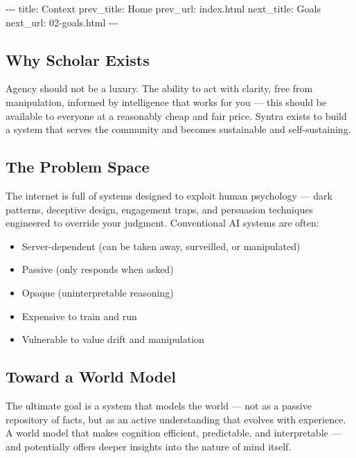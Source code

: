 \documentclass[12pt,a4paper]{article}
\providecommand{\tightlist}{\setlength{\itemsep}{0pt}\setlength{\parskip}{0pt}}
\begin{document}
-\/-\/- title: Context prev\_title: Home prev\_url: index.html
next\_title: Goals next\_url: 02-goals.html -\/-\/-

\subsection{Why Scholar Exists}\label{why-scholar-exists}

Agency should not be a luxury. The ability to act with clarity, free
from manipulation, informed by intelligence that works for you --- this
should be available to everyone at a reasonably cheap and fair price.
Syntra exists to build a system that serves the community and becomes
sustainable and self-sustaining.

\subsection{The Problem Space}\label{the-problem-space}

The internet is full of systems designed to exploit human psychology ---
dark patterns, deceptive design, engagement traps, and persuasion
techniques engineered to override your judgment. Conventional AI systems
are often:

\begin{itemize}
\tightlist
\item
  Server-dependent (can be taken away, surveilled, or manipulated)
\item
  Passive (only responds when asked)
\item
  Opaque (uninterpretable reasoning)
\item
  Expensive to train and run
\item
  Vulnerable to value drift and manipulation
\end{itemize}

\subsection{Toward a World Model}\label{toward-a-world-model}

The ultimate goal is a system that models the world --- not as a passive
repository of facts, but as an active understanding that evolves with
experience. A world model that makes cognition efficient, predictable,
and interpretable --- and potentially offers deeper insights into the
nature of mind itself.
\end{document}
